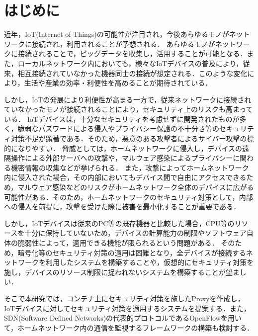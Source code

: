 \documentclass[Japanese]{dicomopapers}
\begin{document}
\section{はじめに}
近年，IoT(Internet of Things)の可能性が注目され，今後あらゆるモノがネットワークに接続され，利用されることが予想される．
あらゆるモノがネットワークに接続されることで，ビッグデータを収集し，活用することが可能となる．また，ローカルネットワーク内においても，様々なIoTデバイスの普及により，従来，相互接続されていなかった機器同士の接続が想定される．このような変化により，生活や産業の効率・利便性を高めることが期待されている．\par
しかし，IoTの発展により利便性が高まる一方で，従来ネットワークに接続されていなかったモノが接続されることにより，セキュリティ上のリスクも高まっている\cite{security}．
IoTデバイスは，十分なセキュリティを考慮せずに開発されたものが多く，脆弱なパスワードによる侵入やプライバシー保護の不十分さ等のセキュリティ対策不足が顕著である\cite{owasp}．そのため，悪意のある攻撃者によるサイバー攻撃の標的になりやすい．
脅威としては，ホームネットワークに侵入し，デバイスの遠隔操作による外部サーバへの攻撃や，マルウェア感染によるプライバシーに関わる機密情報の収集などが挙げられる．
また，攻撃によってホームネットワーク内に侵入された場合，その内部においてもデバイス間で自由にアクセスできるため，マルウェア感染などのリスクがホームネットワーク全体のデバイスに広がる可能性がある．そのため，ホームネットワークのセキュリティ対策として，内部への侵入を前提に，攻撃を受けた際に被害を最小化することが重要である．\par
しかし，IoTデバイスは従来のPC等の既存機器と比較した場合，CPU等のリソースを十分に保持していない\cite{camera}ため，デバイスの計算能力の制限やソフトウェア自体の脆弱性によって，適用できる機能が限られるという問題がある\cite{disap}．
そのため，暗号化等のセキュリティ対策の適用は困難となり，全デバイスが接続するネットワークを利用したシステムを構築することや，仮想的にセキュリティ対策を施し，デバイスのリソース制限に捉われないシステムを構築することが望ましい．\par
そこで本研究では，コンテナ上にセキュリティ対策を施したProxyを作成し，IoTデバイスに対してセキュリティ対策を適用するシステムを提案する．また，SDN(Software Defined Networks)の代表的プロトコルであるOpenFlow\cite{openflow}を用いて，ホームネットワーク内の通信を監視するフレームワークの構築も検討する．
\end{document}
